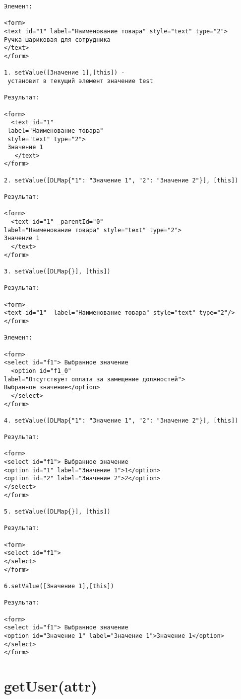 \begin{verbatim}
Элемент:

<form>
<text id="1" label="Наименование товара" style="text" type="2">
Ручка шариковая для сотрудника
</text>
</form>

1. setValue([Значение 1],[this]) -
 установит в текущий элемент значение test

Результат:

<form>
  <text id="1"
 label="Наименование товара" 
 style="text" type="2">
 Значение 1
   </text>
</form>

2. setValue([DLMap{"1": "Значение 1", "2": "Значение 2"}], [this])

Результат:

<form>
  <text id="1" _parentId="0" 
label="Наименование товара" style="text" type="2">
Значение 1
  </text>
</form>

3. setValue([DLMap{}], [this])

Результат:

<form>
<text id="1"  label="Наименование товара" style="text" type="2"/>
</form>

Элемент:

<form>
<select id="f1"> Выбранное значение
  <option id="f1_0" 
label="Отсутствует оплата за замещение должностей">
Выбранное значение</option>
  </select>
</form>

4. setValue([DLMap{"1": "Значение 1", "2": "Значение 2"}], [this])

Результат:

<form>
<select id="f1"> Выбранное значение
<option id="1" label="Значение 1">1</option>
<option id="2" label="Значение 2">2</option>
</select>
</form>

5. setValue([DLMap{}], [this])

Результат:

<form>
<select id="f1">
</select>
</form>

6.setValue([Значение 1],[this])

Результат:

<form>
<select id="f1"> Выбранное значение
<option id="Значение 1" label="Значение 1">Значение 1</option>
</select>
</form>
\end{verbatim}

\hypertarget{getuserattr-string-boolean}{%
\section{getUser(attr)}\label{getuserattr-string-boolean}}

